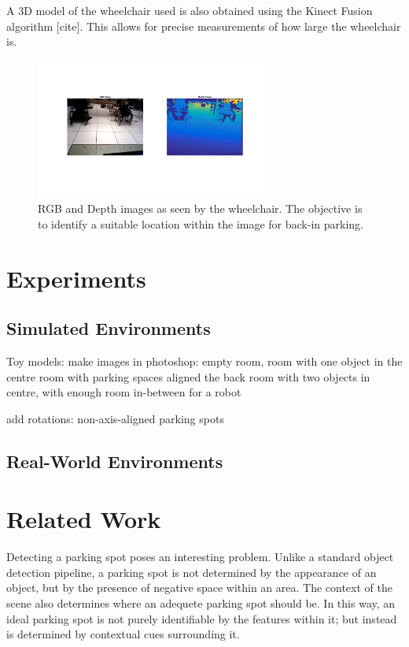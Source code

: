 A 3D model of the wheelchair used is also obtained using the Kinect Fusion
algorithm [cite]. This allows for precise measurements of how large the
wheelchair is.

\begin{figure}
\centering
\includegraphics[width=3in]{figures/rgbdwheelchair.png}
\caption{RGB and Depth images as seen by the wheelchair. The objective is to
identify a suitable location within the image for back-in parking.}
\label{fig:rgbdwheelchair}
\end{figure}

\section{Experiments}

\subsection{Simulated Environments}
Toy models: make images in photoshop:
empty room,
room with one object in the centre
room with parking spaces aligned the back
room with two objects in centre, with enough room in-between for a robot

add rotations:
non-axis-aligned parking spots

\subsection{Real-World Environments}

\section{Related Work}
\label{sec:parkinglotidentificationlitreview}
Detecting a parking spot poses an interesting problem. Unlike a standard object
detection pipeline, a parking spot is not determined by the appearance of an
object, but by the presence of negative space within an area. The context of the
scene also determines where an adequete parking spot should be. In this way, an
ideal parking spot is not purely identifiable by the features within it; but
instead is determined by contextual cues surrounding it.


